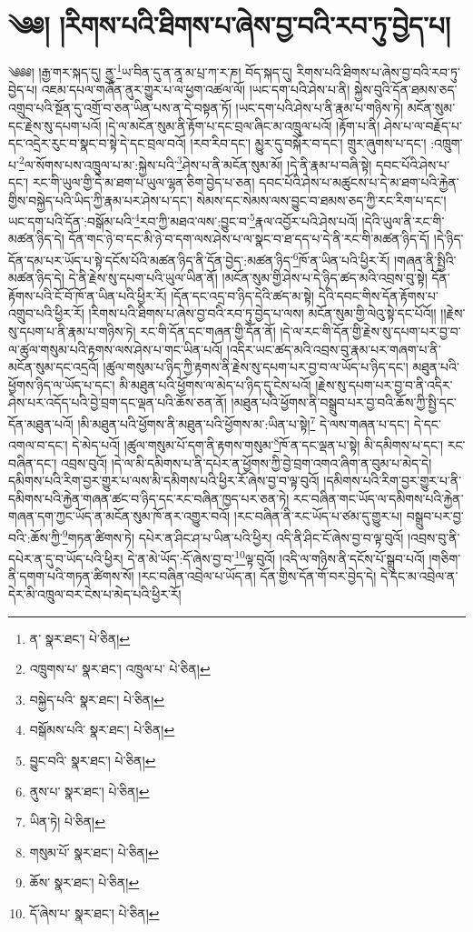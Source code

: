 \setcounter{footnote}{0} 
\chapter{༄༅། །རིགས་པའི་ཐིགས་པ་ཞེས་བྱ་བའི་རབ་ཏུ་བྱེད་པ།}༄༅༅། །རྒྱ་གར་སྐད་དུ། ནྱཱ་\footnote{ན་  སྣར་ཐང་།  པེ་ཅིན། }ཡ་བིན་དུ་ན་ནཱ་མ་པྲ་ཀ་ར་ཎ། བོད་སྐད་དུ། རིགས་པའི་ཐིགས་པ་ཞེས་བྱ་བའི་རབ་ཏུ་བྱེད་པ། འཇམ་དཔལ་གཞོན་ནུར་གྱུར་པ་ལ་ཕྱག་འཚལ་ལོ། །ཡང་དག་པའི་ཤེས་པ་ནི། སྐྱེས་བུའི་དོན་ཐམས་ཅད་འགྲུབ་པའི་སྔོན་དུ་འགྲོ་བ་ཅན་ཡིན་པས་ན་དེ་བསྟན་ཏོ། །ཡང་དག་པའི་ཤེས་པ་ནི་རྣམ་པ་གཉིས་ཏེ། མངོན་སུམ་དང་རྗེས་སུ་དཔག་པའོ། །དེ་ལ་མངོན་སུམ་ནི་རྟོག་པ་དང་བྲལ་ཞིང་མ་འཁྲུལ་པའོ། །རྟོག་པ་ནི། ཤེས་པ་ལ་བརྗོད་པ་དང་འདྲེར་རུང་བ་སྣང་བ་སྟེ་དེ་དང་བྲལ་བའོ། །རབ་རིབ་དང་། མྱུར་དུ་བསྐོར་བ་དང་། གྲུར་ཞུགས་པ་དང་། :འཁྲུག་པ་\footnote{འཁྲུགས་པ་  སྣར་ཐང་། འཁྲུལ་པ་  པེ་ཅིན། }ལ་སོགས་པས་འཁྲུལ་པ་མ་:སྐྱེས་པའི་\footnote{བསྐྱེད་པའི་  སྣར་ཐང་།  པེ་ཅིན། }ཤེས་པ་ནི་མངོན་སུམ་མོ། །དེ་ནི་རྣམ་པ་བཞི་སྟེ། དབང་པོའི་ཤེས་པ་དང་། རང་གི་ཡུལ་གྱི་དེ་མ་ཐག་པ་ཡུལ་ལྷན་ཅིག་བྱེད་པ་ཅན། དབང་པོའི་ཤེས་པ་མཚུངས་པ་དེ་མ་ཐག་པའི་རྐྱེན་གྱིས་བསྐྱེད་པའི་ཡིད་ཀྱི་རྣམ་པར་ཤེས་པ་དང་། སེམས་དང་སེམས་ལས་བྱུང་བ་ཐམས་ཅད་ཀྱི་རང་རིག་པ་དང་། ཡང་དག་པའི་དོན་:བསྒོམ་པའི་\footnote{བསྒོམས་པའི་  སྣར་ཐང་།  པེ་ཅིན། }རབ་ཀྱི་མཐའ་ལས་:བྱུང་བ་\footnote{བྱུང་བའི་  སྣར་ཐང་།  པེ་ཅིན། }རྣལ་འབྱོར་པའི་ཤེས་པའོ། །དེའི་ཡུལ་ནི་རང་གི་མཚན་ཉིད་དེ། དོན་གང་ཉེ་བ་དང་མི་ཉེ་བ་དག་ལས་ཤེས་པ་ལ་སྣང་བ་ཐ་དད་པ་དེ་ནི་རང་གི་མཚན་ཉིད་དོ། །དེ་ཉིད་དོན་དམ་པར་ཡོད་པ་སྟེ་དངོས་པོའི་མཚན་ཉིད་ནི་དོན་བྱེད་:མཚན་ཉིད་\footnote{ནུས་པ་  སྣར་ཐང་།  པེ་ཅིན། }ཁོ་ན་ཡིན་པའི་ཕྱིར་རོ། །གཞན་ནི་སྤྱིའི་མཚན་ཉིད་དེ། དེ་ནི་རྗེས་སུ་དཔག་པའི་ཡུལ་ཡིན་ནོ། །མངོན་སུམ་གྱི་ཤེས་པ་དེ་ཉིད་ཚད་མའི་འབྲས་བུ་སྟེ། དོན་རྟོགས་པའི་ངོ་བོ་ཁོ་ན་ཡིན་པའི་ཕྱིར་རོ། །དོན་དང་འདྲ་བ་ཉིད་དེའི་ཚད་མ་སྟེ། དེའི་དབང་གིས་དོན་རྟོགས་པ་འགྲུབ་པའི་ཕྱིར་རོ། །རིགས་པའི་ཐིགས་པ་ཞེས་བྱ་བའི་རབ་ཏུ་བྱེད་པ་ལས། མངོན་སུམ་གྱི་ལེའུ་སྟེ་དང་པོའོ།། །།རྗེས་སུ་དཔག་པ་ནི་རྣམ་པ་གཉིས་ཏེ། རང་གི་དོན་དང་གཞན་གྱི་དོན་ནོ། །དེ་ལ་རང་གི་དོན་གྱི་རྗེས་སུ་དཔག་པར་བྱ་བ་ལ་ཚུལ་གསུམ་པའི་རྟགས་ལས་ཤེས་པ་གང་ཡིན་པའོ། །འདིར་ཡང་ཚད་མའི་འབྲས་བུ་རྣམ་པར་གཞག་པ་ནི་མངོན་སུམ་དང་འདྲའོ། །ཚུལ་གསུམ་པ་ཉིད་ཀྱི་རྟགས་ནི་རྗེས་སུ་དཔག་པར་བྱ་བ་ལ་ཡོད་པ་ཉིད་དང་། མཐུན་པའི་ཕྱོགས་ཉིད་ལ་ཡོད་པ་དང་། མི་མཐུན་པའི་ཕྱོགས་ལ་མེད་པ་ཉིད་དུ་ངེས་པའོ། །རྗེས་སུ་དཔག་པར་བྱ་བ་ནི་འདིར་ཤེས་པར་འདོད་པའི་བྱེ་བྲག་དང་ལྡན་པའི་ཆོས་ཅན་ནོ། །མཐུན་པའི་ཕྱོགས་ནི་བསྒྲུབ་པར་བྱ་བའི་ཆོས་ཀྱི་སྤྱི་དང་དོན་མཐུན་པའོ། །མི་མཐུན་པའི་ཕྱོགས་ནི་མཐུན་པའི་ཕྱོགས་མ་:ཡིན་པ་སྟེ།\footnote{ཡིན་ཏེ།  པེ་ཅིན། } དེ་ལས་གཞན་པ་དང་། དེ་དང་འགལ་བ་དང་། དེ་མེད་པའོ། །ཚུལ་གསུམ་པོ་དག་ནི་རྟགས་གསུམ་\footnote{གསུམ་པོ་  སྣར་ཐང་།  པེ་ཅིན། }ཁོ་ན་དང་ལྡན་པ་སྟེ། མི་དམིགས་པ་དང་། རང་བཞིན་དང་། འབྲས་བུའོ། །དེ་ལ་མི་དམིགས་པ་ནི་དཔེར་ན་ཕྱོགས་ཀྱི་བྱེ་བྲག་འགའ་ཞིག་ན་བུམ་པ་མེད་དེ། དམིགས་པའི་རིག་བྱར་གྱུར་པ་ལས་མི་དམིགས་པའི་ཕྱིར་རོ་ཞེས་བྱ་བ་ལྟ་བུའོ། །དམིགས་པའི་རིག་བྱར་གྱུར་པ་ནི་དམིགས་པའི་རྐྱེན་གཞན་ཚང་བ་ཉིད་དང་རང་བཞིན་ཁྱད་པར་ཅན་ཏེ། རང་བཞིན་གང་ཡོད་ལ་དམིགས་པའི་རྐྱེན་གཞན་དག་ཀྱང་ཡོད་ན་མངོན་སུམ་ཁོ་ནར་འགྱུར་བའོ། །རང་བཞིན་ནི་རང་ཡོད་པ་ཙམ་དུ་གྱུར་པ། བསྒྲུབ་པར་བྱ་བའི་:ཆོས་ཀྱི་\footnote{ཆོས་  སྣར་ཐང་།  པེ་ཅིན། }གཏན་ཚིགས་ཏེ། དཔེར་ན་ཤིང་ཤ་པ་ཡིན་པའི་ཕྱིར། འདི་ནི་ཤིང་ངོ་ཞེས་བྱ་བ་ལྟ་བུའོ། །འབྲས་བུ་ནི་དཔེར་ན་དུ་བ་ཡོད་པའི་ཕྱིར། དེ་ན་མེ་ཡོད་:དོ་ཞེས་བྱ་བ་\footnote{དོ་ཞེས་པ་  སྣར་ཐང་།  པེ་ཅིན། }ལྟ་བུའོ། །འདི་ལ་གཉིས་ནི་དངོས་པོ་སྒྲུབ་པའོ། །གཅིག་ནི་དགག་པའི་གཏན་ཚིགས་སོ། །རང་བཞིན་འབྲེལ་པ་ཡོད་ན། དོན་གྱིས་དོན་གོ་བར་བྱེད་དེ། དེ་དང་མ་འབྲེལ་ན་དེར་མི་འཁྲུལ་བར་ངེས་པ་མེད་པའི་ཕྱིར་རོ། 